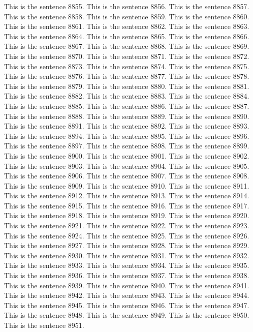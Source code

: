 \documentclass{article}
\begin{document}
This is the sentence 8855.
This is the sentence 8856.
This is the sentence 8857.
This is the sentence 8858.
This is the sentence 8859.
This is the sentence 8860.
This is the sentence 8861.
This is the sentence 8862.
This is the sentence 8863.
This is the sentence 8864.
This is the sentence 8865.
This is the sentence 8866.
This is the sentence 8867.
This is the sentence 8868.
This is the sentence 8869.
This is the sentence 8870.
This is the sentence 8871.
This is the sentence 8872.
This is the sentence 8873.
This is the sentence 8874.
This is the sentence 8875.
This is the sentence 8876.
This is the sentence 8877.
This is the sentence 8878.
This is the sentence 8879.
This is the sentence 8880.
This is the sentence 8881.
This is the sentence 8882.
This is the sentence 8883.
This is the sentence 8884.
This is the sentence 8885.
This is the sentence 8886.
This is the sentence 8887.
This is the sentence 8888.
This is the sentence 8889.
This is the sentence 8890.
This is the sentence 8891.
This is the sentence 8892.
This is the sentence 8893.
This is the sentence 8894.
This is the sentence 8895.
This is the sentence 8896.
This is the sentence 8897.
This is the sentence 8898.
This is the sentence 8899.
This is the sentence 8900.
This is the sentence 8901.
This is the sentence 8902.
This is the sentence 8903.
This is the sentence 8904.
This is the sentence 8905.
This is the sentence 8906.
This is the sentence 8907.
This is the sentence 8908.
This is the sentence 8909.
This is the sentence 8910.
This is the sentence 8911.
This is the sentence 8912.
This is the sentence 8913.
This is the sentence 8914.
This is the sentence 8915.
This is the sentence 8916.
This is the sentence 8917.
This is the sentence 8918.
This is the sentence 8919.
This is the sentence 8920.
This is the sentence 8921.
This is the sentence 8922.
This is the sentence 8923.
This is the sentence 8924.
This is the sentence 8925.
This is the sentence 8926.
This is the sentence 8927.
This is the sentence 8928.
This is the sentence 8929.
This is the sentence 8930.
This is the sentence 8931.
This is the sentence 8932.
This is the sentence 8933.
This is the sentence 8934.
This is the sentence 8935.
This is the sentence 8936.
This is the sentence 8937.
This is the sentence 8938.
This is the sentence 8939.
This is the sentence 8940.
This is the sentence 8941.
This is the sentence 8942.
This is the sentence 8943.
This is the sentence 8944.
This is the sentence 8945.
This is the sentence 8946.
This is the sentence 8947.
This is the sentence 8948.
This is the sentence 8949.
This is the sentence 8950.
This is the sentence 8951.
\end{document}
